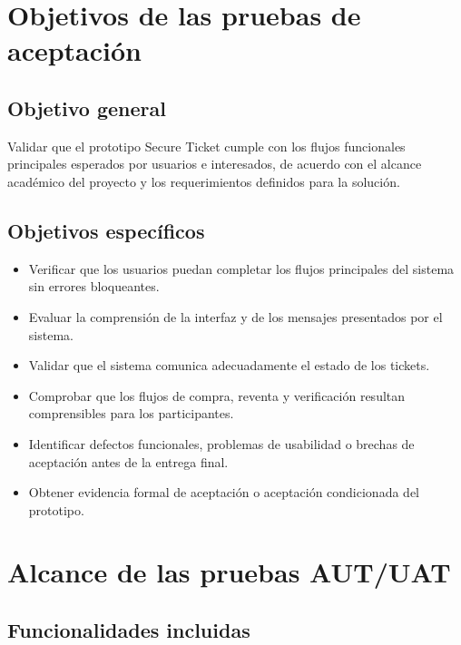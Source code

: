 \documentclass[12pt,letterpaper]{article}
\newcommand{\NombreProyecto}{Secure Ticket}
\begin{document}
\section{Objetivos de las pruebas de aceptación}

\subsection{Objetivo general}

Validar que el prototipo \NombreProyecto{} cumple con los flujos funcionales principales esperados por usuarios e interesados, de acuerdo con el alcance académico del proyecto y los requerimientos definidos para la solución.

\subsection{Objetivos específicos}

\begin{itemize}[leftmargin=*]
    \item Verificar que los usuarios puedan completar los flujos principales del sistema sin errores bloqueantes.
    \item Evaluar la comprensión de la interfaz y de los mensajes presentados por el sistema.
    \item Validar que el sistema comunica adecuadamente el estado de los tickets.
    \item Comprobar que los flujos de compra, reventa y verificación resultan comprensibles para los participantes.
    \item Identificar defectos funcionales, problemas de usabilidad o brechas de aceptación antes de la entrega final.
    \item Obtener evidencia formal de aceptación o aceptación condicionada del prototipo.
\end{itemize}

\section{Alcance de las pruebas AUT/UAT}

\subsection{Funcionalidades incluidas}
\end{document}
